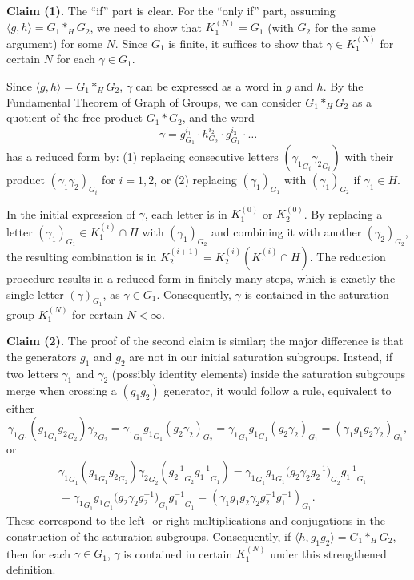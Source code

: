 \documentclass[12pt,leqno]{amsart}
\makeatletter
\renewenvironment{proof}[1][\proofname]{%
	\par
	\pushQED{\qed}%
	\normalfont
	\topsep6\p@\@plus6\p@\relax
	\trivlist
	\item[\hskip\labelsep\itshape #1\@addpunct{.}]%
	\ignorespaces
}{%
	\par\nobreak\vspace{2pt}%
	\popQED%
	\medskip%
	\endtrivlist
	\@endpefalse
}
\newcommand{\2}{L^2_{\rm per}(0, T)}
\numberwithin{equation}{section}
\numberwithin{figure}{section}
\makeatother
\begin{document}
\begin{proof}
    \textbf{Claim (1).} The ``if'' part is clear. For the ``only if'' part, assuming $\langle g,h\rangle = G_1*_H G_2$, we need to show that $K_1^{(N)} = G_1$ (with $G_2$ for the same argument) for some $N$. Since $G_1$ is finite, it suffices to show that $\gamma\in K_1^{(N)}$ for certain $N$ for each $\gamma\in G_1$.

    Since $\langle g,h\rangle = G_1*_H G_2$, $\gamma$ can be expressed as a word in $g$ and $h$. By the Fundamental Theorem of Graph of Groups, we can consider $G_1*_H G_2$ as a quotient of the free product $G_1 * G_2$, and the word
    \[
    \gamma = g^{i_1}_{G_1} \cdot h^{i_2}_{G_2}\cdot g^{i_3}_{G_1}\cdot\dots
    \]
    has a reduced form by: (1) replacing consecutive letters $({\gamma_1}_{G_i}{\gamma_2}_{G_i})$ with their product $(\gamma_1\gamma_2)_{G_i}$ for $i=1,2$, or (2) replacing $(\gamma_1)_{G_1}$ with $(\gamma_1)_{G_2}$ if $\gamma_1\in H$. 
    
    In the initial expression of $\gamma$, each letter is in $K_1^{(0)}$ or $K_2^{(0)}$. By replacing a letter $(\gamma_1)_{G_1}\in K_1^{(i)}\cap H$ with $(\gamma_1)_{G_2}$ and combining it with another $(\gamma_2)_{G_2}$, the resulting combination is in $K_2^{(i+1)} = K_2^{(i)}(K_1^{(i)}\cap H)$. The reduction procedure results in a reduced form in finitely many steps, which is exactly the single letter $(\gamma)_{G_1}$, as $\gamma\in G_1$. Consequently, $\gamma$ is contained in the saturation group $K_1^{(N)}$ for certain $N<\infty$.

    \textbf{Claim (2).} The proof of the second claim is similar; the major difference is that the generators $g_1$ and $g_2$ are not in our initial saturation subgroups. Instead, if two letters $\gamma_1$ and $\gamma_2$ (possibly identity elements) inside the saturation subgroups merge when crossing a $(g_1g_2)$ generator, it would follow a rule, equivalent to either
    \[
    {\gamma_1}_{G_1}({g_1}_{G_1}{g_2}_{G_2}){\gamma_2}_{G_2} = {\gamma_1}_{G_1}{g_1}_{G_1}{(g_2\gamma_2)}_{G_2} = {\gamma_1}_{G_1}{g_1}_{G_1}{(g_2\gamma_2)}_{G_1} = {(\gamma_1g_1g_2\gamma_2)}_{G_1},
    \]
    or
    \[
    \begin{split}
        & {\gamma_1}_{G_1}({g_1}_{G_1}{g_2}_{G_2}){\gamma_2}_{G_2}({g_2^{-1}}_{G_2}{g_1^{-1}}_{G_1}) = {\gamma_1}_{G_1}{g_1}_{G_1}({g_2\gamma_2g_2^{-1})}_{G_2}{g_1^{-1}}_{G_1}\\
        & = {\gamma_1}_{G_1}{g_1}_{G_1}({g_2\gamma_2g_2^{-1})}_{G_1}{g_1^{-1}}_{G_1} = {(\gamma_1g_1g_2\gamma_2g_2^{-1}g_1^{-1})}_{G_1}.
    \end{split}
    \]
    These correspond to the left- or right-multiplications and conjugations in the construction of the saturation subgroups. Consequently, if $\langle h,g_1g_2\rangle = G_1*_H G_2$, then for each $\gamma \in G_1$, $\gamma$ is contained in certain $K_1^{(N)}$ under this strengthened definition.
\end{proof}
\end{document}
